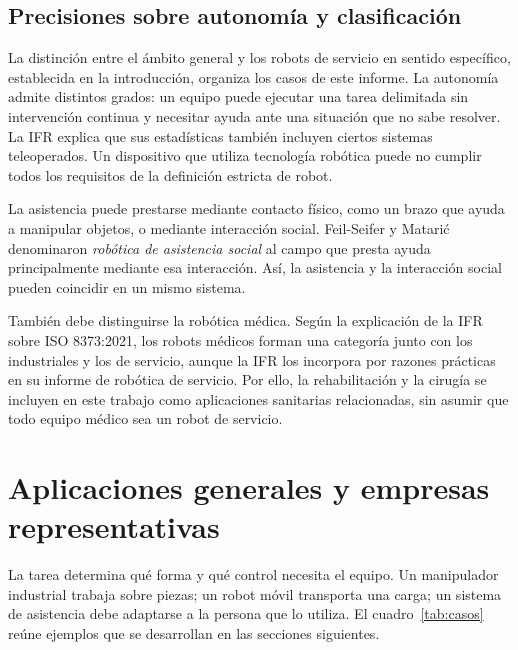 \documentclass[11pt,a4paper]{article}
\begin{document}
\subsection{Precisiones sobre autonomía y clasificación}
La distinción entre el ámbito general y los robots de servicio en sentido específico, establecida en la introducción, organiza los casos de este informe. La autonomía admite distintos grados: un equipo puede ejecutar una tarea delimitada sin intervención continua y necesitar ayuda ante una situación que no sabe resolver. La IFR explica que sus estadísticas también incluyen ciertos sistemas teleoperados. Un dispositivo que utiliza tecnología robótica puede no cumplir todos los requisitos de la definición estricta de robot.\cite{ifr}

La asistencia puede prestarse mediante contacto físico, como un brazo que ayuda a manipular objetos, o mediante interacción social. Feil-Seifer y Matarić denominaron \emph{robótica de asistencia social} al campo que presta ayuda principalmente mediante esa interacción. Así, la asistencia y la interacción social pueden coincidir en un mismo sistema.\cite{feil}

También debe distinguirse la robótica médica. Según la explicación de la IFR sobre ISO 8373:2021, los robots médicos forman una categoría junto con los industriales y los de servicio, aunque la IFR los incorpora por razones prácticas en su informe de robótica de servicio. Por ello, la rehabilitación y la cirugía se incluyen en este trabajo como aplicaciones sanitarias relacionadas, sin asumir que todo equipo médico sea un robot de servicio.\cite{ifr}

\section{Aplicaciones generales y empresas representativas}
La tarea determina qué forma y qué control necesita el equipo. Un manipulador industrial trabaja sobre piezas; un robot móvil transporta una carga; un sistema de asistencia debe adaptarse a la persona que lo utiliza. El cuadro~\ref{tab:casos} reúne ejemplos que se desarrollan en las secciones siguientes.
\end{document}
